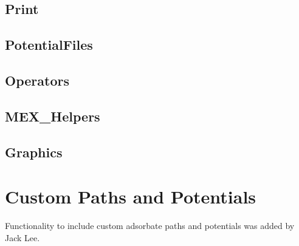 \documentclass[11pt,letterpaper]{article}
\renewcommand{\\}{\bigskip}
\begin{document}
\subsection{Print}

\subsection{PotentialFiles}

\subsection{Operators}

\subsection{MEX\_Helpers}

\subsection{Graphics}

\label{sec:custompaths}
\section{Custom Paths and Potentials}
Functionality to include custom adsorbate paths and potentials was added by Jack Lee.
\end{document}
